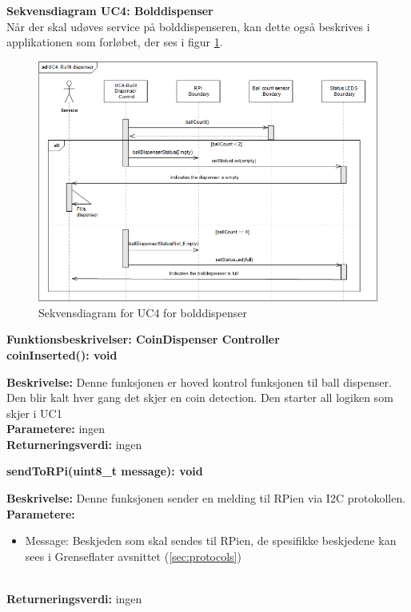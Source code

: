 \documentclass[Arkitektur/System_main.tex]{subfiles}
\begin{document}
\textbf{Sekvensdiagram UC4: Bolddispenser}\\
Når der skal udøves service på bolddispenseren, kan dette også beskrives i applikationen som forløbet, der ses i figur \ref{fig:seq_uc4_balldispenser}.
\begin{figure}[H]
    \centering
    \includegraphics[width=\textwidth]{Arkitektur/Softwarearkitektur/Applikationsmodel/BallDispenser/graphicsBallDispenser/sdUC4.png}
    \caption{Sekvensdiagram for UC4 for bolddispenser}
    \label{fig:seq_uc4_balldispenser}
\end{figure}
\newpage
{\large\textbf{Funktionsbeskrivelser: CoinDispenser Controller}}\\[0.2cm]
\textbf {coinInserted(): void}
\begin{adjustwidth}{1cm}{0pt}
\textbf {Beskrivelse:} Denne funksjonen er hoved kontrol funksjonen til ball dispenser. Den blir kalt hver gang det skjer en coin detection. Den starter all logiken som skjer i UC1 \\ [0.2cm]
\textbf {Parametere:} ingen \\ [0.2cm]
\textbf {Returneringsverdi:} ingen \\ [0.2cm]
\end{adjustwidth}

\textbf {sendToRPi(uint8\_t message): void}
\begin{adjustwidth}{1cm}{0pt}
\textbf {Beskrivelse:} Denne funksjonen sender en melding til RPien via I2C protokollen. \\ [0.2cm]
\textbf {Parametere:} 
\begin{itemize}
    \item Message: Beskjeden som skal sendes til RPien, de spesifikke beskjedene kan sees i Grenseflater avsnittet (\ref{sec:protocols})
\end{itemize}
\\ [0.2cm]
\textbf {Returneringsverdi:} ingen \\ [0.2cm]
\end{adjustwidth}
\end{document}
